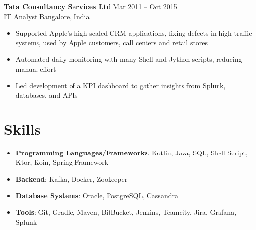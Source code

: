 \documentclass[a4paper,9pt]{article}  %
\begin{document}
\textbf{Tata Consultancy Services Ltd} \hfill Mar 2011 -- Oct 2015\\
IT Analyst \hfill Bangalore, India \vspace{-5pt}\\
\begin{itemize}[left=0pt, label=\textbullet, itemsep=0pt, parsep=0pt, topsep=0pt, partopsep=0pt]
    \item Supported Apple’s high scaled CRM applications, fixing defects in high-traffic systems, used by Apple customers, call centers and retail stores
    \item Automated daily monitoring with many Shell and Jython scripts, reducing manual effort
    \item Led development of a KPI dashboard to gather insights from Splunk, databases, and APIs
\end{itemize}
\vspace{8pt}


\section*{Skills}

\begin{itemize}[left=0pt, label=\textbullet, itemsep=0pt, parsep=0pt, topsep=0pt, partopsep=0pt]
    \item \textbf{Programming Languages/Frameworks}: Kotlin, Java, SQL, Shell Script, Ktor, Koin, Spring Framework
    \item \textbf{Backend}: Kafka, Docker, Zookeeper
    \item \textbf{Database Systems}: Oracle, PostgreSQL, Cassandra
    \item \textbf{Tools}: Git, Gradle, Maven, BitBucket, Jenkins, Teamcity, Jira, Grafana, Splunk
\end{itemize}
\end{document}
